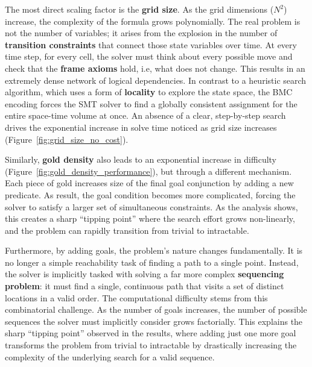 \documentclass[12pt, a4paper, oneside]{report} %
\begin{document}
The most direct scaling factor is the \textbf{grid size}. As the grid dimensions ($N^2$) increase, the complexity of the formula grows polynomially. The real problem is not the number of variables; it arises from the explosion in the number of \textbf{transition constraints} that connect those state variables over time. At every time step, for every cell, the solver must think about every possible move and check that the \textbf{frame axioms} hold, i.e, what does not change. This results in an extremely dense network of logical dependencies. In contrast to a heuristic search algorithm, which uses a form of \textbf{locality} to explore the state space, the BMC encoding forces the SMT solver to find a globally consistent assignment for the entire space-time volume at once. An absence of a clear, step-by-step search drives the exponential increase in solve time noticed as grid size increases (Figure~\ref{fig:grid_size_no_cost}).

Similarly, \textbf{gold density} also leads to an exponential increase in difficulty (Figure~\ref{fig:gold_density_performance}), but through a different mechanism. Each piece of gold increases size of the final goal conjunction by adding a new predicate. As result, the goal condition becomes more complicated, forcing the solver to satisfy a larger set of simultaneous constraints. As the analysis shows, this creates a sharp ``tipping point'' where the search effort grows non-linearly, and the problem can rapidly transition from trivial to intractable.

Furthermore, by adding goals, the problem’s nature changes fundamentally. It is no longer a simple reachability task of finding a path to a single point. Instead, the solver is implicitly tasked with solving a far more complex \textbf{sequencing problem}: it must find a single, continuous path that visits a set of distinct locations in a valid order. The computational difficulty stems from this combinatorial challenge. As the number of goals increases, the number of possible sequences the solver must implicitly consider grows factorially. This explains the sharp ``tipping point'' observed in the results, where adding just one more goal transforms the problem from trivial to intractable by drastically increasing the complexity of the underlying search for a valid sequence.
\end{document}
